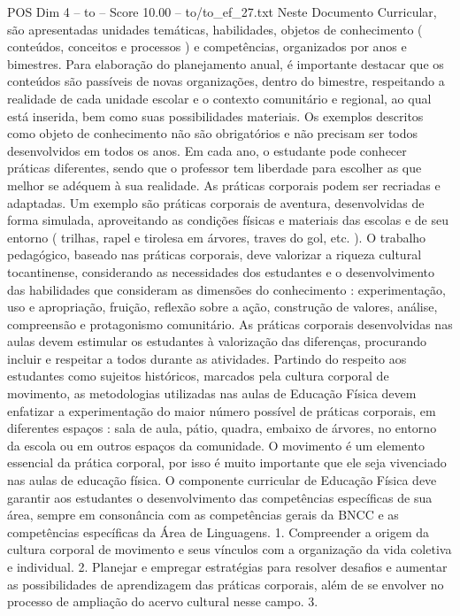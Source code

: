 \begin{textsample}{POS Dim 4 – to – Score 10.00 – to/to\_ef\_27.txt}
Neste Documento Curricular, são apresentadas unidades temáticas, habilidades, objetos de conhecimento ( conteúdos, conceitos e processos ) e competências, organizados por anos e bimestres.
Para elaboração do planejamento anual, é importante destacar que os conteúdos são passíveis de novas organizações, dentro do bimestre, respeitando a realidade de cada unidade escolar e o contexto comunitário e regional, ao qual está inserida, bem como suas possibilidades materiais.
Os exemplos descritos como objeto de conhecimento não são obrigatórios e não precisam ser todos desenvolvidos em todos os anos.
Em cada ano, o estudante pode conhecer práticas diferentes, sendo que o professor tem liberdade para escolher as que melhor se adéquem à sua realidade.
As práticas corporais podem ser recriadas e adaptadas.
Um exemplo são práticas corporais de aventura, desenvolvidas de forma simulada, aproveitando as condições físicas e materiais das escolas e de seu entorno ( trilhas, rapel e tirolesa em árvores, traves do gol, etc. ).
O trabalho pedagógico, baseado nas práticas corporais, deve valorizar a riqueza cultural tocantinense, considerando as necessidades dos estudantes e o desenvolvimento das habilidades que consideram as dimensões do conhecimento : experimentação, uso e apropriação, fruição, reflexão sobre a ação, construção de valores, análise, compreensão e protagonismo comunitário.
As práticas corporais desenvolvidas nas aulas devem estimular os estudantes à valorização das diferenças, procurando incluir e respeitar a todos durante as atividades.
Partindo do respeito aos estudantes como sujeitos históricos, marcados pela cultura corporal de movimento, as metodologias utilizadas nas aulas de Educação Física devem enfatizar a experimentação do maior número possível de práticas corporais, em diferentes espaços : sala de aula, pátio, quadra, embaixo de árvores, no entorno da escola ou em outros espaços da comunidade.
O movimento é um elemento essencial da prática corporal, por isso é muito importante que ele seja vivenciado nas aulas de educação física.
O componente curricular de Educação Física deve garantir aos estudantes o desenvolvimento das competências específicas de sua área, sempre em consonância com as competências gerais da BNCC e as competências específicas da Área de Linguagens. 1.
Compreender a origem da cultura corporal de movimento e seus vínculos com a organização da vida coletiva e individual. 2.
Planejar e empregar estratégias para resolver desafios e aumentar as possibilidades de aprendizagem das práticas corporais, além de se envolver no processo de ampliação do acervo cultural nesse campo. 3.

\end{textsample}
